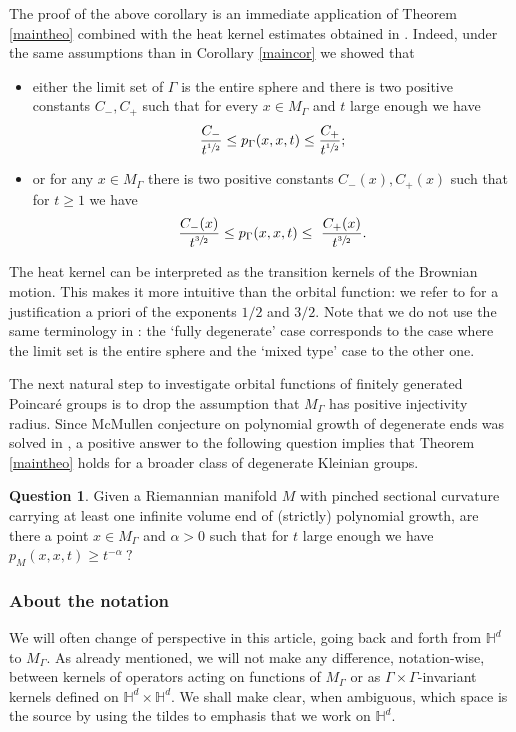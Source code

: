 \documentclass[JEP,XML,SOM,Unicode,NoFloatCountersInSection,published]{cedram}
\theoremstyle{plain}
\theoremstyle{definition}
\newtheorem*{question}{Question}
\newcommand{\HH}{\mathbb{H}}
\begin{document}
The proof of the above corollary is an immediate application of Theorem \ref{maintheo} combined with the heat kernel estimates obtained in \cite{artmoiheatcounting1}. Indeed, under the same assumptions than in Corollary \ref{maincor} we showed \cite[Th.\,1.10]{artmoiheatcounting1} that
\begin{itemize}
\item either the limit set of $\Gamma$ is the entire sphere and there is two positive constants $C_-, C_+$ such that for every $x \in M_{\Gamma}$ and $t$ large enough we have
\[
\frac{C_-}{t^{\sfrac{1}{2}}} \le p_{\Gamma}(x,x,t) \le \frac{C_+}{t^{\sfrac{1}{2}}} ;
\]
\item or for any $x \in M_{\Gamma}$ there is two positive constants $C_-(x), C_+(x)$ such that for $t \ge 1$ we have
\[
\frac{ C_-(x)}{t^{\sfrac{3}{2}}} \le p_{\Gamma}(x,x,t) \le \ \frac{C_+(x)}{t^{\sfrac{3}{2}}}.
\]
\end{itemize}

The heat kernel can be interpreted as the transition kernels of the Brownian motion. This makes it more intuitive than the orbital function: we refer to \cite{artmoiheatcounting1} for a justification a priori of the exponents $1/2$ and $3/2$. Note that we do not use the same terminology in \cite{artmoiheatcounting1}: the `fully degenerate' case corresponds to the case where the limit set is the entire sphere and the `mixed type' case to the other one.

The next natural step to investigate orbital functions of finitely generated Poincaré groups is to drop the assumption that $M_{\Gamma}$ has positive injectivity radius. Since McMullen conjecture on polynomial growth of degenerate ends was solved in \cite[Volume growth th., p.\,5]{artendinglamination}, a positive answer to the following question implies that Theorem \ref{maintheo} holds for a broader class of degenerate Kleinian groups.

\begin{question}
Given a Riemannian manifold $M$ with pinched sectional curvature carrying at least one infinite volume end of (strictly) polynomial growth, are there a point $x \in M_{\Gamma}$ and $\alpha > 0$ such that for $t$ large enough we have
$ p_{M}(x,x,t) \ge t^{-\alpha} \ ?$
\end{question}

\subsubsection*{About the notation} We will often change of perspective in this article, going back and forth from $\HH^d$ to $M_{\Gamma}$. As already mentioned, we will not make any difference, notation-wise, between kernels of operators acting on functions of $M_{\Gamma}$ or as $\Gamma \times \Gamma$-invariant kernels defined on $\HH^d \times \HH^d$. We shall make clear, when ambiguous, which space is the source by using the tildes to emphasis that we work on $\HH^d$.
\end{document}

